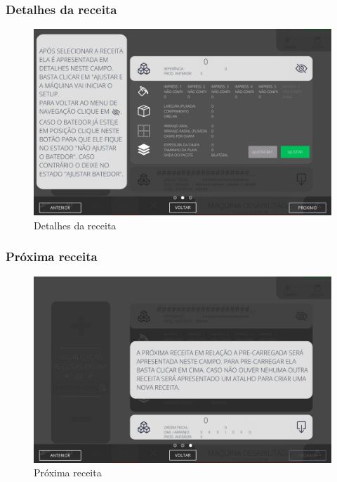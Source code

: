 \newpage
\thispagestyle{fancy}
\vspace*{40 pt}
\subsubsection{\small{Detalhes da receita}} \label{sec:telaCarregandoPedidoDetalhesReceita}
\vspace*{\fill}
\begin{figure}[h]
    \centering
    \includegraphics[width=576 px,height=360 px]{src/imagesICV/09-request/visualization/e-5.png}
    \caption{Detalhes da receita}
\end{figure}
\vspace*{\fill}

\newpage
\thispagestyle{fancy}
\vspace*{40 pt}
\subsubsection{\small{Próxima receita}} \label{sec:telaCarregandoPedidoProximaReceita}
\vspace*{\fill}
\begin{figure}[h]
    \centering
    \includegraphics[width=576 px,height=360 px]{src/imagesICV/09-request/visualization/e-6.png}
    \caption{Próxima receita}
\end{figure}
\vspace*{\fill}

